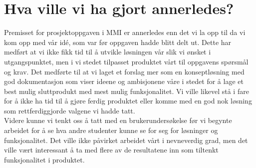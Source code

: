 \section{Hva ville vi ha gjort annerledes?}
Premisset for prosjektoppgaven i MMI er annerledes enn det vi la opp til da vi kom opp med vår idé, som var før oppgaven hadde blitt delt ut. Dette har medført at vi ikke fikk tid til å utvikle løsningen vår slik vi ønsket i utgangspunktet, men i vi stedet tilpasset produktet vårt til oppgavens spørsmål og krav.
Det medførte til at vi laget et forslag mer som en konseptløsning med god dokumentasjon som viser ideene og ambisjonene våre i stedet for å lage et best mulig sluttprodukt med mest mulig funksjonalitet. Vi ville likevel stå i fare for å ikke ha tid til å gjøre ferdig produktet eller komme med en god nok løsning som rettferdiggjorde valgene vi hadde tatt.\\
Videre kunne vi tenkt oss å tatt med en brukerundersøkelse før vi begynte arbeidet for å se hva andre studenter kunne se for seg for løsninger og funksjonalitet. Det ville ikke påvirket arbeidet vårt i nevneverdig grad, men det ville vært interessant å ta med flere av de resultatene inn som tiltenkt funksjonalitet i produktet.
